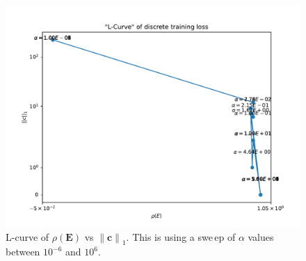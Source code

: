 \documentclass{article}
\newcommand{\norm}[1]{\left\lVert#1\right\rVert}
\newcommand{\mat}[1]{\bm{{#1}}}
\renewcommand{\vec}[1]{\bm{{#1}}}
\begin{document}
\begin{figure}[h]
  \includegraphics[width=\textwidth]{figures/lcurve.pdf}
  \caption{L-curve of $\rho\left(\mat{E}\right)$ vs $\norm{\vec{c}}_1$.  This is using a swe\,ep of $\alpha$ values between $10^{-6}$ and $10^{6}$.}
  \label{fig:lcurve}
\end{figure}
\end{document}
